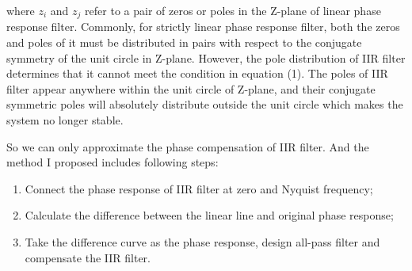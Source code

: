\documentclass[a4paper]{tufte-handout} %
\begin{document}
where $z_i$ and $z_j$ refer to a pair of zeros or poles in the Z-plane of linear phase response filter. Commonly, for strictly linear phase response filter, both the zeros and poles of it must be distributed in pairs with respect to the conjugate symmetry of the unit circle in Z-plane. However, the pole distribution of IIR filter determines that it cannot meet the condition in equation (1). The poles of IIR filter appear anywhere within the unit circle of Z-plane, and their conjugate symmetric poles will absolutely distribute outside the unit circle which makes the system no longer stable.

So we can only approximate the phase compensation of IIR filter. And the method I proposed includes following steps:
\begin{enumerate}
    \item Connect the phase response of IIR filter at zero and Nyquist frequency;
    \item Calculate the difference between the linear line and original phase response;
    \item Take the difference curve as the phase response, design all-pass filter and compensate the IIR filter.
\end{enumerate}
\end{document}
